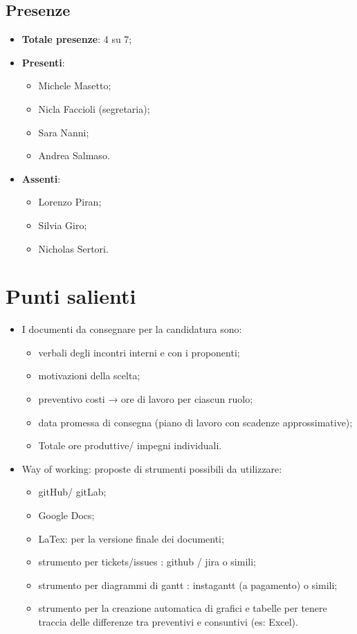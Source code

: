 \documentclass[11pt]{article}
\begin{document}
	\subsection{Presenze}
	\begin{itemize}
		\item \textbf{Totale presenze}: 4 su 7;
		\item \textbf{Presenti}:
		\begin{itemize}  
			\item Michele Masetto;
			\item Nicla Faccioli (segretaria);
			\item Sara Nanni;
			\item Andrea Salmaso.
		\end{itemize}
		\item \textbf{Assenti}:
			\begin{itemize}
				\item Lorenzo Piran;
				\item Silvia Giro;
				\item Nicholas Sertori.
			\end{itemize}
	\end{itemize}

	\newpage

	\section{Punti salienti}
		\begin{itemize}
			\item I documenti da consegnare per la candidatura sono:
				\begin{itemize}
					\item verbali degli incontri interni e con i proponenti;
					\item motivazioni della scelta;
					\item preventivo costi → ore di lavoro per ciascun ruolo;
					\item data promessa di consegna (piano di lavoro con scadenze approssimative);
					\item Totale ore produttive/ impegni individuali.
				\end{itemize}
			\item Way of working: proposte di strumenti possibili da utilizzare:
				\begin{itemize}
					\item gitHub/ gitLab;
					\item Google Docs;
					\item LaTex: per la versione finale dei documenti;
					\item strumento per tickets/issues : github / jira o simili;
					\item strumento per diagrammi di gantt : instagantt (a pagamento) o simili;
					\item strumento per la creazione automatica di grafici e tabelle per tenere traccia delle differenze tra preventivi e consuntivi (es: Excel).
				\end{itemize}
		\end{itemize}
		
		
		
		
		
		
		
		
		
		
		
		
		
		
		
\end{document}
